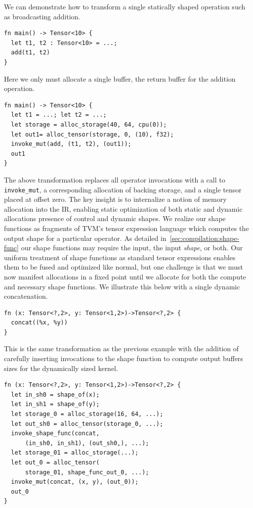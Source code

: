 We can demonstrate how to transform a single statically shaped operation such as broadcasting addition.

\begin{verbatim}
fn main() -> Tensor<10> {
  let t1, t2 : Tensor<10> = ...;
  add(t1, t2)
}
\end{verbatim}

Here we only must allocate a single buffer, the return buffer for the addition operation.

\begin{verbatim}
fn main() -> Tensor<10> {
  let t1 = ...; let t2 = ...;
  let storage = alloc_storage(40, 64, cpu(0));
  let out1= alloc_tensor(storage, 0, (10), f32);
  invoke_mut(add, (t1, t2), (out1));
  out1
}
\end{verbatim}

The above transformation replaces all operator invocations with a call to
  \verb|invoke_mut|, a corresponding allocation of backing storage, and a single tensor placed at offset zero.
The key insight is to internalize a notion of memory allocation into the IR,
  enabling static optimization of both static and dynamic allocations presence of control and dynamic shapes.
We realize our shape functions as fragments of TVM's tensor expression language
  which computes the output shape for a particular operator.
As detailed in~\autoref{sec:compilation:shape-func} our shape functions
  may require the input, the input \textit{shape}, or both.
Our uniform treatment of shape functions as standard tensor expressions enables them
  to be fused and optimized like normal, but one challenge is that we must now manifest allocations
  in a fixed point until we allocate for both the compute and necessary shape functions.
We illustrate this below with a single dynamic concatenation.

\begin{verbatim}
fn (x: Tensor<?,2>, y: Tensor<1,2>)->Tensor<?,2> {
  concat((%x, %y))
}
\end{verbatim}

This is the same transformation as the previous example with the addition of carefully inserting
invocations to the shape function to compute output buffers sizes for the dynamically sized kernel.

\begin{verbatim}
fn (x: Tensor<?,2>, y: Tensor<1,2>)->Tensor<?,2> {
  let in_sh0 = shape_of(x);
  let in_sh1 = shape_of(y);
  let storage_0 = alloc_storage(16, 64, ...);
  let out_sh0 = alloc_tensor(storage_0, ...);
  invoke_shape_func(concat,
      (in_sh0, in_sh1), (out_sh0,), ...);
  let storage_01 = alloc_storage(...);
  let out_0 = alloc_tensor(
      storage_01, shape_func_out_0, ...);
  invoke_mut(concat, (x, y), (out_0));
  out_0
}
\end{verbatim}

